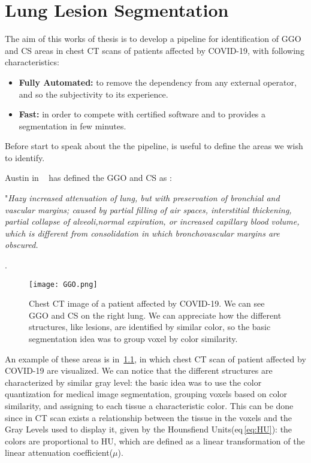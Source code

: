 \documentclass{standalone}
\begin{document}
	\chapter{Lung Lesion Segmentation}
	

	The aim of this works of thesis is to develop a pipeline for identification of GGO and CS areas in chest CT scans of patients affected by COVID-19, with following characteristics:   
	\begin{itemize}
		\item  \textbf{Fully Automated: } to remove the dependency from any external operator, and so the subjectivity to its experience. 
		
		\item \textbf{Fast: } in order to compete with certified software and to provides a segmentation in few minutes.
	\end{itemize}
	
	Before start to speak about the the pipeline, is useful to define the areas we wish to identify.
	
	Austin in ~\cite{ART:Austin} has defined the GGO and CS as :  
	\begin{center}
	"\emph{Hazy increased attenuation of lung, but with preservation of bronchial and vascular margins; caused by partial filling of air spaces, interstitial thickening, partial collapse of alveoli,normal expiration, or increased capillary blood volume, which is different from consolidation in which bronchovascular margins are obscured.}
	\end{center}. 
		
	\begin{figure}[h!]
		\centering
		\texttt{[image: GGO.png]}
		\caption{Chest CT image of a patient affected by COVID-19. We can see GGO and CS on the right lung. We can appreciate how the different structures, like lesions, are identified by similar color, so the basic segmentation idea was to group voxel by color similarity.}
		\label{fig:GGO}
	\end{figure}

	An example of these areas is in \figurename\,\ref{fig:GGO}, in which chest CT scan of patient affected by COVID-19 are visualized.
	We can notice that the different structures are characterized by similar gray level: the basic idea was to use the color quantization for medical image segmentation, grouping voxels based on color similarity, and  assigning  to each tissue a characteristic color. This can be done since in CT scan exists a relationship between the tissue in the voxels and the Gray Levels used to display it, given by the Hounsfiend Units(eq\,\ref{eq:HU}): the colors are proportional to HU, which are defined as a linear transformation of the linear attenuation coefficient($\mu$).
	
\end{document}
